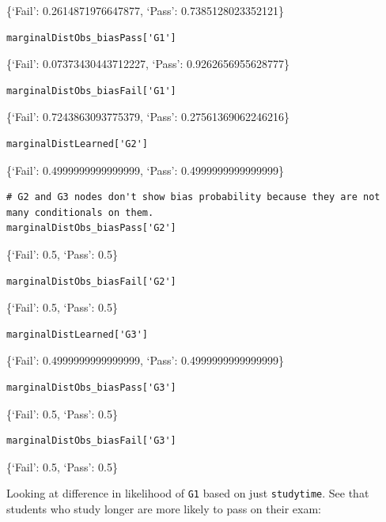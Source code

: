 \documentclass[
]{article}
\begin{document}
\{`Fail': 0.2614871976647877, `Pass': 0.7385128023352121\}

\begin{verbatim}
marginalDistObs_biasPass['G1']
\end{verbatim}

\{`Fail': 0.07373430443712227, `Pass': 0.9262656955628777\}

\begin{verbatim}
marginalDistObs_biasFail['G1']
\end{verbatim}

\{`Fail': 0.7243863093775379, `Pass': 0.27561369062246216\}

\begin{verbatim}
marginalDistLearned['G2']
\end{verbatim}

\{`Fail': 0.4999999999999999, `Pass': 0.4999999999999999\}

\begin{verbatim}
# G2 and G3 nodes don't show bias probability because they are not many conditionals on them.
marginalDistObs_biasPass['G2']
\end{verbatim}

\{`Fail': 0.5, `Pass': 0.5\}

\begin{verbatim}
marginalDistObs_biasFail['G2']
\end{verbatim}

\{`Fail': 0.5, `Pass': 0.5\}

\begin{verbatim}
marginalDistLearned['G3']
\end{verbatim}

\{`Fail': 0.4999999999999999, `Pass': 0.4999999999999999\}

\begin{verbatim}
marginalDistObs_biasPass['G3']
\end{verbatim}

\{`Fail': 0.5, `Pass': 0.5\}

\begin{verbatim}
marginalDistObs_biasFail['G3']
\end{verbatim}

\{`Fail': 0.5, `Pass': 0.5\}

Looking at difference in likelihood of \texttt{G1} based
on just \texttt{studytime}. See that students who study
longer are more likely to pass on their exam:
\end{document}
